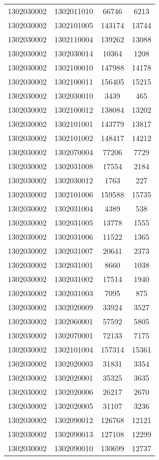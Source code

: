 \begin{longtable}{llcc}
1302030002 & 1302011010 & 66746 & 6213\\
1302030002 & 1302101005 & 143174 & 13744\\
1302030002 & 1302110004 & 139262 & 13088\\
1302030002 & 1302030014 & 10364 & 1208\\
1302030002 & 1302100010 & 147988 & 14178\\
1302030002 & 1302100011 & 156405 & 15215\\
1302030002 & 1302030010 & 3439 & 465\\
1302030002 & 1302100012 & 138084 & 13202\\
1302030002 & 1302101001 & 143779 & 13817\\
1302030002 & 1302101002 & 148417 & 14212\\
1302030002 & 1302070004 & 77206 & 7729\\
1302030002 & 1302031008 & 17554 & 2184\\
1302030002 & 1302030012 & 1763 & 227\\
1302030002 & 1302101006 & 159588 & 15735\\
1302030002 & 1302031004 & 4389 & 538\\
1302030002 & 1302031005 & 13778 & 1555\\
1302030002 & 1302031006 & 11522 & 1365\\
1302030002 & 1302031007 & 20641 & 2373\\
1302030002 & 1302031001 & 8660 & 1038\\
1302030002 & 1302031002 & 17514 & 1940\\
1302030002 & 1302031003 & 7095 & 875\\
1302030002 & 1302020009 & 33924 & 3527\\
1302030002 & 1302060001 & 57592 & 5805\\
1302030002 & 1302070001 & 72133 & 7175\\
1302030002 & 1302101004 & 157314 & 15361\\
1302030002 & 1302020003 & 31831 & 3354\\
1302030002 & 1302020001 & 35325 & 3635\\
1302030002 & 1302020006 & 26217 & 2670\\
1302030002 & 1302020005 & 31107 & 3236\\
1302030002 & 1302090012 & 126768 & 12121\\
1302030002 & 1302090013 & 127108 & 12299\\
1302030002 & 1302090010 & 130699 & 12737\\

\end{longtable}
